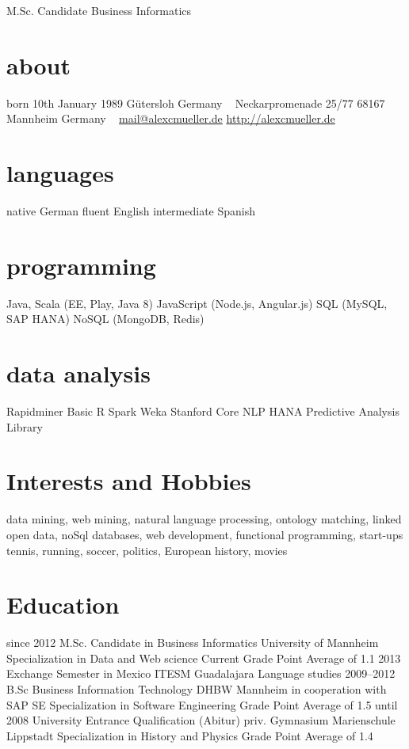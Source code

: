 \documentclass[a4paper]{friggeri-cv}
\begin{document}
       {M.Sc. Candidate Business Informatics}


\begin{aside}
  \section{about}
  	born 10th January 1989
  	Gütersloh Germany
  	~
   	Neckarpromenade 25/77
    68167 Mannheim
    Germany
    ~
    \href{mailto:alexan.chr.mueller@gmail.com}{mail@alexcmueller.de}
    \href{http://alexcmueller.de}{http://alexcmueller.de}
  \section{languages}
    native German
    fluent English
    intermediate Spanish
  \section{programming}
    Java, Scala
    (EE, Play, Java 8)
    JavaScript
    (Node.js, Angular.js)
    SQL
    (MySQL, SAP HANA)
    NoSQL
    (MongoDB, Redis)
    \section{data analysis}
   	Rapidminer
   	Basic R
   	Spark
   	Weka
   	Stanford Core NLP
   	HANA Predictive Analysis Library
\end{aside}

\section{Interests and Hobbies}

data mining, web mining, natural language processing, ontology matching, linked open data, noSql databases, web development, functional programming, start-ups \\
tennis, running, soccer, politics, European history, movies

\section{Education}

\begin{entrylist}
  \eduentry
    {since 2012}
    {M.Sc. Candidate in Business Informatics}
    {University of Mannheim}
    {Specialization in Data and Web science}
    {Current Grade Point Average of 1.1}
   \entry
    {2013}
    {Exchange Semester in Mexico}
    {ITESM Guadalajara}
    {Language studies}
  \eduentry
    {2009–2012}
    {B.Sc Business Information Technology}
    {DHBW Mannheim in cooperation with SAP SE}
    {Specialization in Software Engineering}
    {Grade Point Average of 1.5}
  \eduentry
    {until 2008}
    {University Entrance Qualification (Abitur)}
    {priv. Gymnasium Marienschule Lippstadt}
    {Specialization in History and Physics}
    {Grade Point Average of 1.4}
\end{entrylist}
\end{document}
